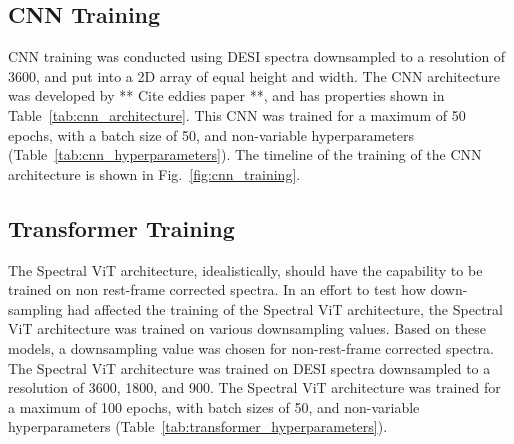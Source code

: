 \subsection{CNN Training}
\label{ssec:cnn_training}
CNN training was conducted using DESI spectra downsampled to a resolution of 3600, and 
put into a 2D array of equal height and width. The CNN architecture was developed 
by ** Cite eddies paper **, and has properties shown in Table~\ref{tab:cnn_architecture}.
This CNN was trained for a maximum of 50 epochs, with a batch size of 50, and 
non-variable hyperparameters (Table~\ref{tab:cnn_hyperparameters}). 
The timeline of the training of the CNN architecture is shown in Fig.~\ref{fig:cnn_training}.


\subsection{Transformer Training}
\label{sec:transformer_training}
The Spectral ViT architecture, idealistically, should have the capability to be trained 
on non rest-frame corrected spectra. In an effort to test how down-sampling had 
affected the training of the Spectral ViT architecture, the Spectral ViT architecture
was trained on various downsampling values. Based on these models, a downsampling 
value was chosen for non-rest-frame corrected spectra. The Spectral ViT architecture 
was trained on DESI spectra downsampled to a resolution of 3600, 1800, and 900. 
The Spectral ViT architecture was trained for a maximum of 100 epochs, with 
batch sizes of 50, and non-variable hyperparameters (Table~\ref{tab:transformer_hyperparameters}).
